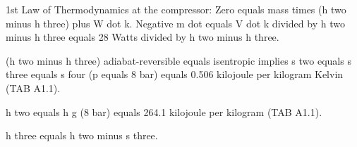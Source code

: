 1st Law of Thermodynamics at the compressor:  
Zero equals mass times (h two minus h three) plus W dot k.  
Negative m dot equals V dot k divided by h two minus h three equals 28 Watts divided by h two minus h three.  

(h two minus h three) adiabat-reversible equals isentropic implies s two equals s three equals s four (p equals 8 bar) equals 0.506 kilojoule per kilogram Kelvin (TAB A1.1).  

h two equals h g (8 bar) equals 264.1 kilojoule per kilogram (TAB A1.1).  

h three equals h two minus s three.